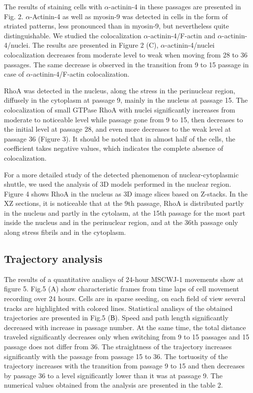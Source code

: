 \documentclass[alpha-refs]{wiley-article}
\begin{document}
The results of staining cells with $\alpha$-actinin-4 in these passages are presented in Fig. 2.
$\alpha$-Actinin-4 as well as myosin-9 was detected in cells in the form of striated patterns, less pronounced than in myosin-9, but nevertheless quite distinguishable.
We studied the colocalization $\alpha$-actinin-4/F-actin and $\alpha$-actinin-4/nuclei.
The results are presented in Figure 2 (C), $\alpha$-actinin-4/nuclei colocalization decreases from moderate level to weak when moving from 28 to 36 passages.
The same decrease is observed in the transition from 9 to 15 passage in case of $\alpha$-actinin-4/F-actin colocalization.

RhoA was detected in the nucleus, along the stress in the perinuclear region, diffusely in the cytoplasm at passage 9, mainly in the nucleus at passage 15.
The colocalization of small GTPase RhoA with nuclei significantly increases from moderate to noticeable level while passage gone from 9 to 15, then decreases to the initial level at passage 28, and even more decreases to the weak level at passage 36 (Figure 3).
It should be noted that in almost half of the cells, the coefficient takes negative values, which indicates the complete absence of colocalization.

For a more detailed study of the detected phenomenon of nuclear-cytoplasmic shuttle, we used the analysis of 3D models performed in the nuclear region.
Figure 4 shows RhoA in the nucleus as 3D image slices based on Z-stacks.
In the XZ sections, it is noticeable that at the 9th passage, RhoA is distributed partly in the nucleus and partly in the cytolasm, at the 15th passage for the most part inside the nucleus and in the perinuclear region, and at the 36th passage only along stress fibrils and in the cytoplasm.

\subsection{Trajectory analysis}

The results of a quantitative analisys of 24-hour MSCWJ-1 movements show at figure 5.
Fig.5 (A) show characteristic frames from time laps of cell movement recording over 24 hours.
Сells are in sparse seeding, on each field of view several tracks are highlighted with colored lines.
Statistical analisys of the obtained trajectories are presented in Fig.5 (В).
Speed and path length significantly decreased with increase in passage number.
At the same time, the total distance traveled significantly decreases only when switching from 9 to 15 passages and 15 passage does not differ from 36.
The straightness of the trajectory increases significantly with the passage from passage 15 to 36.
The tortuosity of the trajectory increases with the transition from passage 9 to 15 and then decreases by passage 36 to a level significantly lower than it was at passage 9.
The numerical values obtained from the analysis are presented in the table 2.
\end{document}
